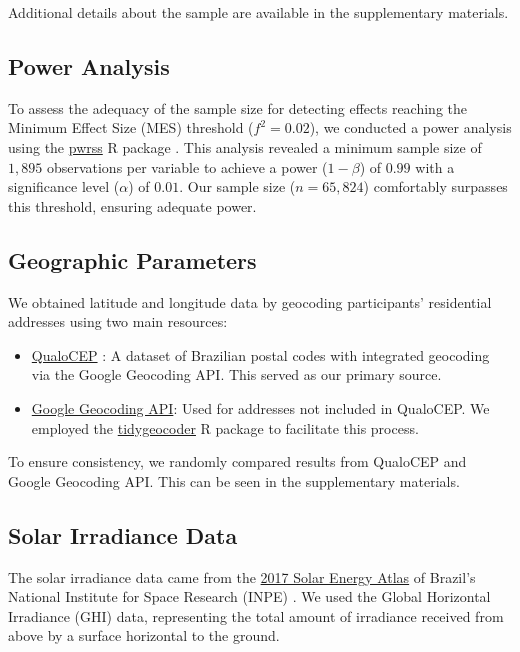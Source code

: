 \documentclass[
12pt,
openright,
oneside,
a4paper,
chapter=TITLE,
section=TITLE,
french,
spanish,
brazil,
english
]{abntex2}
\providecommand{\tightlist}{
\setlength{\itemsep}{0ex}\setlength{\parskip}{0\baselineskip}}
\begin{document}
Additional details about the sample are available in the supplementary
materials.

\subsection{Power Analysis}\label{power-analysis}

To assess the adequacy of the sample size for detecting effects reaching
the Minimum Effect Size (MES) threshold (\(f^2 = 0.02\)), we conducted a
power analysis using the
\href{https://cran.r-project.org/web/packages/pwrss/vignettes/examples.html}{pwrss}
R package \autocite{bulus}. This analysis revealed a minimum sample size
of \(1,895\) observations per variable to achieve a power
(\(1 - \beta\)) of \(0.99\) with a significance level (\(\alpha\)) of
\(0.01\). Our sample size (\(n = 65,824\)) comfortably surpasses this
threshold, ensuring adequate power.

\subsection{Geographic Parameters}\label{geographic-parameters}

We obtained latitude and longitude data by geocoding participants'
residential addresses using two main resources:

\begin{itemize}
\tightlist
\item
  \href{https://www.qualocep.com/}{QualoCEP} \autocite{qualocep2024}: A
  dataset of Brazilian postal codes with integrated geocoding via the
  Google Geocoding API. This served as our primary source.
\item
  \href{https://developers.google.com/maps/documentation/geocoding/overview}{Google
  Geocoding API}: Used for addresses not included in QualoCEP. We
  employed the
  \href{https://jessecambon.github.io/tidygeocoder/}{tidygeocoder} R
  package \autocite{cambon2021} to facilitate this process.
\end{itemize}

To ensure consistency, we randomly compared results from QualoCEP and
Google Geocoding API. This can be seen in the supplementary materials.

\subsection{Solar Irradiance Data}\label{solar-irradiance-data}

The solar irradiance data came from the
\href{https://labren.ccst.inpe.br/atlas_2017.html}{2017 Solar Energy
Atlas} of Brazil's National Institute for Space Research (INPE)
\autocite{pereira2017}. We used the Global Horizontal Irradiance (GHI)
data, representing the total amount of irradiance received from above by
a surface horizontal to the ground.
\end{document}
